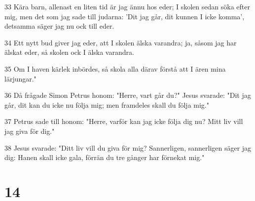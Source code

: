 \par 33 Kära barn, allenast en liten tid är jag ännu hos eder; I skolen sedan söka efter mig, men det som jag sade till judarna: 'Dit jag går, dit kunnen I icke komma', detsamma säger jag nu ock till eder.
\par 34 Ett nytt bud giver jag eder, att I skolen älska varandra; ja, såsom jag har älskat eder, så skolen ock I älska varandra.
\par 35 Om I haven kärlek inbördes, så skola alla därav förstå att I ären mina lärjungar."
\par 36 Då frågade Simon Petrus honom: "Herre, vart går du?" Jesus svarade: "Dit jag går, dit kan du icke nu följa mig; men framdeles skall du följa mig."
\par 37 Petrus sade till honom: "Herre, varför kan jag icke följa dig nu? Mitt liv vill jag giva för dig."
\par 38 Jesus svarade: "Ditt liv vill du giva för mig? Sannerligen, sannerligen säger jag dig: Hanen skall icke gala, förrän du tre gånger har förnekat mig."

\chapter{14}

